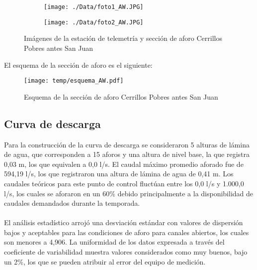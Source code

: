 \documentclass[]{article}
\begin{document}
\begin{figure}[H]
  \centering
\begin{subfigure}{.49\textwidth}
  \texttt{[image: ./Data/foto1\_AW.JPG]}
\end{subfigure}
\hfill
\begin{subfigure}{.49\textwidth}
  \texttt{[image: ./Data/foto2\_AW.JPG]}
\end{subfigure}
\caption{Imágenes de la estación de telemetría y sección de aforo Cerrillos Pobres antes San Juan}
\label{fig:fotos_23}
\end{figure}

El esquema de la sección de aforo es el siguiente:

\begin{figure}[H]
  \centering
  \texttt{[image: temp/esquema\_AW.pdf]}
\caption{Esquema de la sección de aforo Cerrillos Pobres antes San Juan}
\label{fig:Esquema_AW}
\end{figure}

\subsection{Curva de descarga}\label{curva-de-descarga-22}

Para la construcción de la curva de descarga se consideraron 5 alturas de lámina de agua, que corresponden a 15 aforos y una altura de nivel base, la que registra 0,03 m, los que equivalen a 0,0 l/s. El caudal máximo promedio aforado fue de 594,19 l/s, los que registraron una altura de lámina de agua de 0,41 m. Los caudales teóricos para este punto de control fluctúan entre los 0,0 l/s y 1.000,0 l/s, los cuales se aforaron en un 60\% debido principalmente a la disponibilidad de caudales demandados durante la temporada.\\
\\
El análisis estadístico arrojó una desviación estándar con valores de dispersión bajos y aceptables para las condiciones de aforo para canales abiertos, los cuales son menores a 4,906. La uniformidad de los datos expresada a través del coeficiente de variabilidad muestra valores considerados como muy buenos, bajo un 2\%, los que se pueden atribuir al error del equipo de medición.
\end{document}
